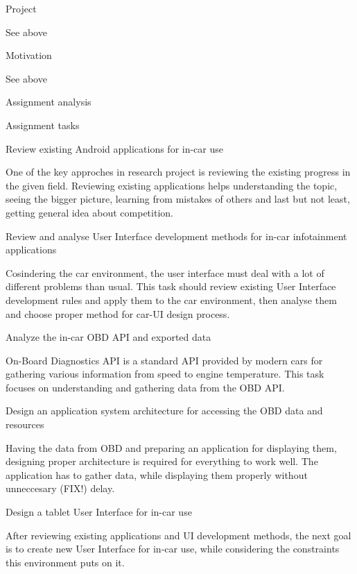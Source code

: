\sec Project

See above

\secc Motivation

See above

\sec Assignment analysis

\secc Assignment tasks

\seccc Review existing Android applications for in-car use

One of the key approches in research project is reviewing the existing progress in the given field. Reviewing existing applications helps understanding the topic, seeing the bigger picture, learning from mistakes of others and last but not least, getting general idea about competition.

\seccc Review and analyse User Interface development methods for in-car infotainment applications

Cosindering the car environment, the user interface must deal with a lot of different problems than usual. This task should review existing User Interface development rules and apply them to the car environment, then analyse them and choose proper method for car-UI design process.

\seccc Analyze the in-car OBD API and exported data

On-Board Diagnostics API is a standard API provided by modern cars for gathering various information from speed to engine temperature. This task focuses on understanding and gathering data from the OBD API.

\seccc Design an application system architecture for accessing the OBD data and resources

Having the data from OBD and preparing an application for displaying them, designing proper architecture is required for everything to work well. The application has to gather data, while displaying them properly without unneccesary (FIX!) delay.

\seccc Design a tablet User Interface for in-car use

After reviewing existing applications and UI development methods, the next goal is to create new User Interface for in-car use, while considering the constraints this environment puts on it.

